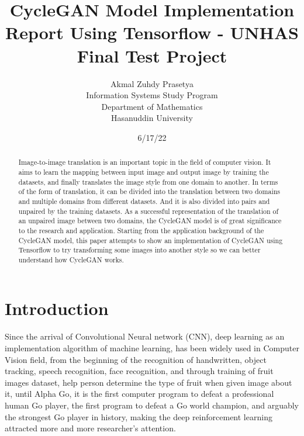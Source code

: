 \documentclass[peerreview]{IEEEtran}
\begin{document}
\title{CycleGAN Model Implementation Report Using Tensorflow - UNHAS Final Test Project}



\author{Akmal Zuhdy Prasetya \\
Information Systems Study Program \\
Department of Mathematics \\
Hasanuddin University\\
}
\date{6/17/22}

\maketitle
\tableofcontents
\listoffigures
\listoftables

\IEEEpeerreviewmaketitle
\begin{abstract}
Image-to-image translation is an important topic in the field of computer vision. It aims to learn the mapping between input image and output image by training the datasets, and finally translates the image style from one domain to another. In terms of the form of translation, it can be divided into the translation between two domains and multiple domains from different datasets. And it is also divided into pairs and unpaired by the training datasets. As a successful representation of the translation of an unpaired image between two domains, the CycleGAN model is of great significance to the research and application. Starting from the application background of the CycleGAN model, this paper attempts to show an implementation of CycleGAN using Tensorflow to try transforming some images into another style so we can better understand how CycleGAN works.

\end{abstract}


\section{Introduction}

Since the arrival of Convolutional Neural network (CNN), deep learning as an implementation algorithm of machine learning, has been widely used in Computer Vision field, from the beginning of the recognition of handwritten, object tracking, speech recognition, face recognition, and through training of fruit images dataset, help person determine the type of fruit when given image about it, until Alpha Go, it is the first computer program to defeat a professional human Go player, the first program to defeat a Go world champion, and arguably the strongest Go player in history, making the deep reinforcement learning attracted more and more researcher's attention.
\end{document}
